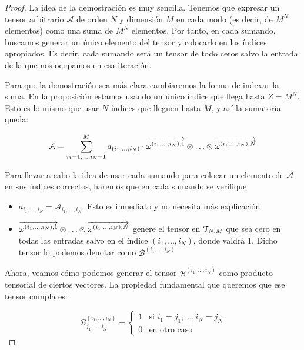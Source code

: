 \begin{proof}
    La idea de la demostración es muy sencilla. Tenemos que expresar un tensor arbitrario $\mathcal{A}$ de orden $N$ y dimensión $M$ en cada modo (es decir, de $M^N$ elementos) como una suma de $M^N$ elementos. Por tanto, en cada sumando, buscamos generar un único elemento del tensor y colocarlo en los índices apropiados. Es decir, cada sumando será un tensor de todo ceros salvo la entrada de la que nos ocupamos en esa iteración.

    Para que la demostración sea más clara cambiaremos la forma de indexar la suma. En la proposición estamos usando un único índice que llega hasta $Z = M^N$. Esto es lo mismo que usar $N$ índices que lleguen hasta $M$, y así la sumatoria queda:

    \begin{equation}
        \mathcal{A} = \sum_{i_1 = 1, \ldots, i_N = 1}^M a_{(i_1, \ldots, i_N)} \cdot \overrightarrow{\omega^{(i_1, \ldots, i_N), 1}} \otimes \ldots \otimes \overrightarrow{\omega^{(i_1, \ldots, i_N), N}}
    \end{equation}

    Para llevar a cabo la idea de usar cada sumando para colocar un elemento de $\mathcal{A}$ en sus índices correctos, haremos que en cada sumando se verifique

    \begin{itemize}
        \item $a_{i_1, \ldots, i_N} = \mathcal{A}_{i_1, \ldots, i_N}$. Esto es inmediato y no necesita más explicación
        \item $\overrightarrow{\omega^{(i_1, \ldots, i_N), 1}} \otimes \ldots \otimes \overrightarrow{\omega^{(i_1, \ldots, i_N), N}}$ genere el tensor en $\mathcal{T}_{N, M}$ que sea cero en todas las entradas salvo en el índice $(i_1, \ldots, i_N)$, donde valdrá 1. Dicho tensor lo podemos denotar como  $\mathcal{B}^{(i_1, \ldots, i_N)}$
    \end{itemize}

    Ahora, veamos cómo podemos generar el tensor $\mathcal{B}^{(i_1, \ldots, i_N)}$ como producto tensorial de ciertos vectores. La propiedad fundamental que queremos que ese tensor cumpla es:

    \begin{equation}
        \mathcal{B}^{(i_1, \ldots, i_N)}_{j_1, \ldots, j_N} =
        \begin{cases}
            1 & \text{si } i_1 = j_1, \ldots, i_N = j_N \\
            0 & \text{en otro caso}
        \end{cases}
    \end{equation}


\end{proof}
